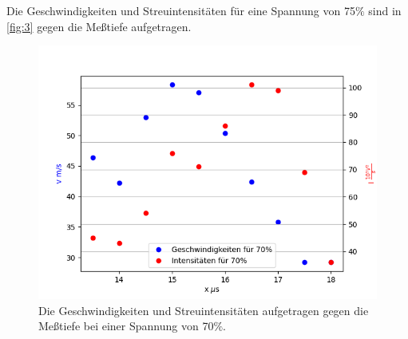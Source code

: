 Die Geschwindigkeiten und Streuintensitäten für eine Spannung von 75$\%$ sind in \autoref{fig:3} gegen die Meßtiefe aufgetragen.
\begin{figure}[H]
  \centering
  \includegraphics[width=12cm]{content/3}
  \caption{Die Geschwindigkeiten und Streuintensitäten aufgetragen gegen die Meßtiefe bei einer Spannung von 70$\%$.}
  \label{fig:3}
\end{figure}
